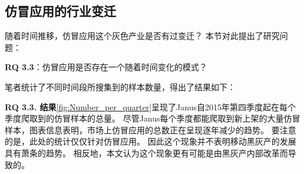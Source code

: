 \subsection{仿冒应用的行业变迁}
随着时间推移，仿冒应用这个灰色产业是否有过变迁？
本节对此提出了研究问题：

{\bf RQ 3.3}：仿冒应用是否存在一个随着时间变化的模式？

笔者统计了不同时间段所搜集到的样本数量，得出了结果如下：

{\bf RQ 3.3. 结果}\autoref{fig:Number_per_quarter}呈现了Janus自2015年第四季度起在每个季度爬取到的仿冒样本的总量。
尽管Janus每个季度都能爬取到新上架的大量仿冒样本，图表信息表明，市场上仿冒应用的总数正在呈现逐年减少的趋势。
要注意的是，此处的统计仅仅针对仿冒应用。
因此这个现象并不表明移动黑灰产的发展具有萧条的趋势。
相反地，本文认为这个现象更有可能是由黑灰产内部改革而导致的。

